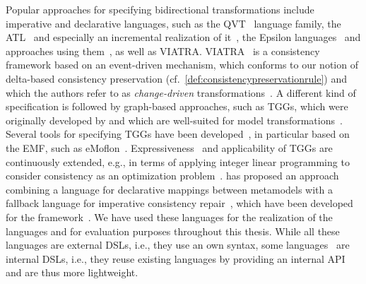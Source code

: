 Popular approaches for specifying bidirectional transformations include imperative and declarative languages, such as the \gls{QVT}~\cite{qvt} language family, the \gls{ATL}~\cite{jouault2006a,xiong2007a} and especially an incremental realization of it~\cite{martinez2017incrementalATL-SCP}, the Epsilon languages~\cite{kolovos2014epsilon-Book} and approaches using them~\cite{samidehkordi2018evlStrace-IST}, as well as \gls{VIATRA}.
\gls{VIATRA}~\cite{bergmann2015viatra-ICMT, varro2016viatra-SoSym} is a consistency framework based on an event-driven mechanism, which conforms to our notion of delta-based consistency preservation (cf.\ \autoref{def:consistencypreservationrule}) and which the authors refer to as \emph{change-driven} transformations~\cite{bergmann2012changeDriven-SoSym}.
A different kind of specification is followed by graph-based approaches, such as \glspl{TGG}, which were originally developed by \textcite{schuerr1995a} and which are well-suited for model transformations~\cite{anjorin2014EfficientSynchronizationTGG-ECMFA}.
Several tools for specifying \glspl{TGG} have been developed~\cite{leblebici2014IncrementalTGGSurvey-GTVMT}, in particular based on the \gls{EMF}, such as eMoflon~\cite{anjorin2014diss}.
Expressiveness~\cite{anjorin2012complexManipulationTGG-BX} and applicability of \glspl{TGG} are continuously extended, e.g., in terms of applying integer linear programming to consider consistency as an optimization problem~\cite{weidmann2019TGGandILP-SLE,weidmann2020TGGsAndILPSchemaCompliance-FASE}.
 has proposed an approach combining a language for declarative mappings between metamodels with a fallback language for imperative consistency repair~, which have been developed for the \vitruv framework~.
We have used these languages for the realization of the \commonalities languages and for evaluation purposes throughout this thesis.
While all these languages are external \glspl{DSL}, i.e., they use an own syntax, some languages~\cite{buchmann2018bxtend-Modelsward, hinkel2019internalTransformation-SoSym} are internal \glspl{DSL}, i.e., they reuse existing languages by providing an internal \gls{API} and are thus more lightweight.

